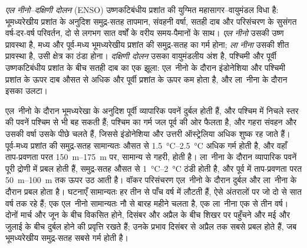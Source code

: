 \begin{definition}[एल नीनो--दक्षिणी दोलन; एल नीनो; ला नीना; दक्षिणी दोलन]\label{def:b2:climate-variability:enso}
\emph{एल नीनो--दक्षिणी दोलन} (ENSO) उष्णकटिबंधीय प्रशांत की
युग्मित महासागर--वायुमंडल विधा है: भूमध्यरेखीय प्रशांत के अनुदिश समुद्र-सतह तापमान, संवहनी वर्षा, सतही दाब
और परिसंचरण के सुसंगत वर्ष-दर-वर्ष परिवर्तन,
दो से लगभग सात वर्षों के वरीय समय-पैमानों के साथ। \emph{एल
नीनो} उसकी उष्ण प्रावस्था है, मध्य और पूर्व-मध्य भूमध्यरेखीय प्रशांत की
समुद्र-सतह का गर्म होना; \emph{ला नीना} उसकी शीत प्रावस्था है, उसी क्षेत्र का
ठंडा होना। \emph{दक्षिणी दोलन} उसका वायुमंडलीय अंश है,
पश्चिमी और पूर्वी उष्णकटिबंधीय प्रशांत के बीच सतही दाब का एक झूला: एल~नीनो के दौरान
इंडोनेशिया और पश्चिमी प्रशांत के ऊपर दाब औसत से अधिक और पूर्वी प्रशांत के ऊपर कम होता है,
और ला~नीना के दौरान इसका उलटा।
\end{definition}

एल~नीनो के दौरान भूमध्यरेखा के अनुदिश पूर्वी व्यापारिक पवनें दुर्बल होती हैं, और पश्चिम में
निचले स्तर की पवनें पश्चिम से भी बह सकती हैं; पश्चिम का गर्म जल पूर्व की ओर फैलता है, और गहरा
संवहन और उसकी वर्षा उसके पीछे चलते हैं, जिससे इंडोनेशिया और उत्तरी ऑस्ट्रेलिया अधिक शुष्क रह जाते हैं।
पूर्व-मध्य प्रशांत की समुद्र-सतह सामान्यतः औसत से \qtyrange{1.5}{2.5}{\celsius} अधिक गर्म होती है, और
वहाँ ताप-प्रवणता परत \qtyrange{150}{175}{m} पर, सामान्य से गहरी, होती है। ला~नीना के दौरान व्यापारिक
पवनें पूरी द्रोणी में प्रबल होती हैं, समुद्र-सतह औसत से \qtyrange{1}{2}{\celsius} ठंडी होती है, और
पूर्व में ताप-प्रवणता परत \qtyrange{50}{100}{m} तक ऊपर उठ आती है। वॉकर परिसंचरण
एल~नीनो के दौरान दुर्बल और ला~नीना के दौरान प्रबल होता है। घटनाएँ सामान्यतः हर तीन से
पाँच वर्ष में लौटती हैं, ऐसे अंतरालों पर जो दो से सात वर्ष तक रहे हैं; एक एल~नीनो सामान्यतः नौ से
बारह महीने चलता है, एक ला~नीना एक से तीन वर्ष। दोनों मार्च और जून के बीच विकसित होने,
दिसंबर और अप्रैल के बीच शिखर पर पहुँचने और मई और जुलाई के बीच दुर्बल होने की प्रवृत्ति रखते हैं; उनके
प्रभाव दिसंबर से अप्रैल तक सबसे प्रबल होते हैं, जब भूमध्यरेखीय समुद्र-सतह सबसे गर्म होती है।

